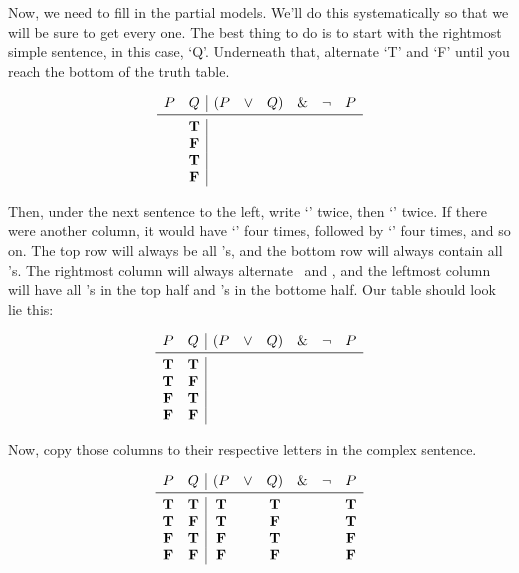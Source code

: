 \documentclass[../logic-text.tex]{subfiles}
\begin{document}
Now, we need to fill in the partial models.
We'll do this systematically so that we will be sure to get every one.
The best thing to do is to start with the rightmost simple sentence, in this case, \enquote*{Q}.
Underneath that, alternate \enquote*{T} and \enquote*{F} until you reach the bottom of the truth table.


\[
  \begin{array}{cc|cccccc}
    P & Q & (P & \lor & Q) & \land & \lneg & P \\ \midrule
    & \true &&&&&&\\
    & \false &&&&&&\\
    & \true &&&&&&\\
    &\false &&&&&&\\
\end{array}
\]

Then, under the next sentence to the left, write \enquote*{\true} twice, then \enquote*{\false} twice.
If there were another column, it would have \enquote*{\true} four times, followed by \enquote*{\false} four times, and so on.
The top row will always be all \true's, and the bottom row will always contain all \false's.
The rightmost column will always alternate \true\ and \false, and the leftmost column will have all \true's in the top half and \false's in the bottome half.
Our table should look lie this:

\[
  \begin{array}{cc|cccccc}
    P & Q & (P & \lor & Q) & \land & \lneg & P \\ \midrule
    \true & \true &&&&&&\\
    \true & \false &&&&&&\\
    \false & \true &&&&&&\\
    \false &\false &&&&&&\\
\end{array}
\]


Now, copy those columns to their respective letters in the complex sentence.


\[
  \begin{array}{cc|cccccc}
    P & Q & (P & \lor & Q) & \land & \lneg & P \\ \midrule
    \true & \true & \true&& \true &&& \true \\
    \true & \false & \true && \false &&& \true \\
    \false & \true & \false && \true &&& \false \\
    \false &\false & \false && \false &&& \false \\
\end{array}
\]
\end{document}
